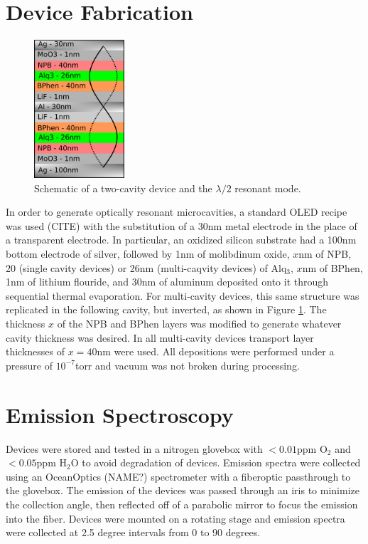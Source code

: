 \documentclass{report}
\begin{document}
    \section{Device Fabrication} \label{fab}
    \begin{figure}
        \centering
        \includegraphics[width=0.3\textwidth]{images/schematic.png}
        \caption{\small Schematic of a two-cavity device and the $\lambda/2$ resonant mode.}
        \label{fig:schematic}
    \end{figure}
    In order to generate optically resonant microcavities, a standard OLED recipe was used (CITE) with the substitution of a 30nm metal electrode in the place of a transparent electrode. In particular, an oxidized silicon substrate had a 100nm bottom electrode of silver, followed by 1nm of molibdinum oxide, $x$nm of NPB, 20 (single cavity devices) or 26nm (multi-caqvity devices) of Alq$_3$, $x$nm of BPhen, 1nm of lithium flouride, and 30nm of aluminum deposited onto it through sequential thermal evaporation. For multi-cavity devices, this same structure was replicated in the following cavity, but inverted, as shown in Figure \ref{fig:schematic}. The thickness $x$ of the NPB and BPhen layers was modified to generate whatever cavity thickness was desired. In all multi-cavity devices transport layer thicknesses of $x=40$nm were used. All depositions were performed under a pressure of $10^{-7}$torr and vacuum was not broken during processing.

    \section{Emission Spectroscopy} \label{spect}
    Devices were stored and tested in a nitrogen glovebox with $<0.01$ppm O$_2$ and $<0.05$ppm H$_2$O to avoid degradation of devices. Emission spectra were collected using an OceanOptics (NAME?) spectrometer with a fiberoptic passthrough to the glovebox. The emission of the devices was passed through an iris to minimize the collection angle, then reflected off of a parabolic mirror to focus the emission into the fiber. Devices were mounted on a rotating stage and emission spectra were collected at 2.5 degree intervals from 0 to 90 degrees.
\end{document}
